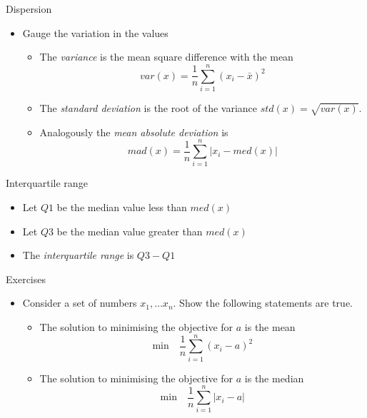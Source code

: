 \documentclass{beamer}
\begin{document}
\begin{frame}{Dispersion}  
\begin{itemize} 
 \item Gauge the variation in the values 
\begin{itemize} 
\item The \emph{variance} is the mean square difference with the mean 
\begin{displaymath} 
 var(x) = \frac{1}{n}\sum_{i=1}^n (x_i - \bar{x})^2
\end{displaymath}
 \item The \emph{standard deviation} is the root of the variance $std(x) = \sqrt{var(x)}$. 
\item Analogously the \emph{mean absolute deviation} is 
\begin{displaymath} 
  mad(x) = \frac{1}{n}\sum_{i=1}^n |x_i - med(x)|
\end{displaymath}
\end{itemize}
\end{itemize}
\end{frame}

\begin{frame}{Interquartile range} 
 \begin{itemize} 
  \item Let $Q1$ be the median value less than $med(x)$ 
  \item Let $Q3$ be the median value greater than $med(x)$
  \item The \emph{interquartile range} is $Q3 - Q1$ 
 \end{itemize}
\end{frame}

\begin{frame}{Exercises}  
\begin{itemize} 
 \item Consider a set of numbers $x_1, \ldots x_n$. Show the following statements are true. 
\begin{itemize} 
\item The solution to minimising the objective for $a$ is the mean 
\begin{displaymath} 
 \mbox{min} \quad  \frac{1}{n}\sum_{i=1}^n (x_i - a)^2
\end{displaymath}
\item The solution to minimising the objective for $a$ is the median 
\begin{displaymath} 
 \mbox{min} \quad  \frac{1}{n}\sum_{i=1}^n |x_i - a|
\end{displaymath}
\end{itemize}
 \end{itemize}
\end{frame}
\end{document}

